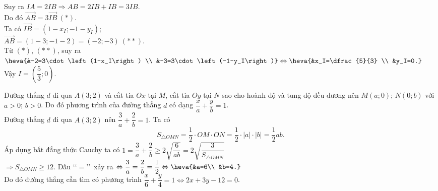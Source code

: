 \begin{ex}
{\begin{itemchoice}
{Suy ra $IA=2IB\Rightarrow AB=2IB+IB=3IB$.\\
Do đó $\overrightarrow{AB}=3\overrightarrow{IB}\ (*)$.\\
Ta có $\overrightarrow{IB}=\left(1-x_I;-1-y_I\right)$;\\ $\overrightarrow{AB}=(1-3;-1-2)=(-2;-3)\ (* *)$.\\
Từ $(*)$, $(**)$, suy ra $\heva{&-2=3\cdot\left(1-x_I\right) \\
&-3=3\cdot\left(-1-y_I\right)} \Leftrightarrow\heva{&x_I=\dfrac{5}{3} \\
&y_I=0.}$\\
Vậy $I=\left(\dfrac{5}{3}; 0\right)$.}
{
}
\itemch Đường thẳng $d$ đi qua $A(3; 2)$ và cắt tia $Ox$ tại $M$, cắt tia $Oy$ tại $N$ sao cho hoành độ và tung độ đều dương nên $M(a;0)$; $N(0;b)$ với $a > 0$; $b > 0$. Do đó phương trình của đường thẳng $d$ có dạng $\dfrac{x}{a}+\dfrac{y}{b}=1$.\\
Đường thẳng $d$ đi qua $A(3; 2)$ nên $\dfrac{3}{a}+\dfrac{2}{b}=1$. Ta có
\[
S_{\triangle OMN}=\dfrac{1}{2}\cdot OM\cdot ON=\dfrac{1}{2} \cdot|a|\cdot|b|=\dfrac{1}{2}ab.
\]
Áp dụng bất đẳng thức Cauchy ta có $1=\dfrac{3}{a}+\dfrac{2}{b} \geq 2\sqrt{\dfrac{6}{a b}}=2\sqrt{\dfrac{3}{S_{\triangle OMN}}}$\\
$\Rightarrow S_{\triangle OMN} \geq 12$. Dấu \lq\lq $=$\rq\rq\, xảy ra $\Leftrightarrow \dfrac{3}{a}=\dfrac{2}{b}=\dfrac{1}{2} \Leftrightarrow\heva{&a=6\\	&b=4.}$\\
Do đó đường thẳng cần tìm có phương trình $\dfrac{x}{6}+\dfrac{y}{4}=1\Leftrightarrow 2x+3y-12=0$.
\end{itemchoice}
}
\end{ex}


